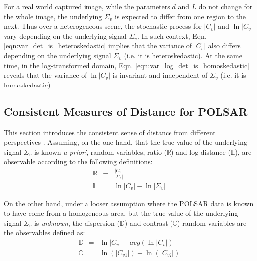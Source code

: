 \documentclass[journal]{IEEEtran}
\begin{document}
For a real world captured image, while the parameters $d$ and $L$ do not change for the whole image,
  the underlying $\Sigma_v$ is expected to differ from one region to the next.
Thus over a heterogeneous scene, the stochastic process for $|C_v|$ and $\ln |C_v|$ vary depending on the underlying signal $\Sigma_v$. 
In such context, Eqn. \ref{eqn:var_det_is_heteroskedastic} implies that the variance of $|C_v|$ also differs depending on the underlying signal $\Sigma_v$ (i.e. it is   heteroskedastic).
At the same time, in the log-transformed domain, Eqn. \ref{eqn:var_log_det_is_homoskedastic} reveals that
  the variance of $\ln |C_v|$ is invariant and independent of $\Sigma_v$ (i.e. it is homoskedastic).

\subsection{Consistent Measures of Distance for POLSAR}
\label{sec:distance_measure}

 This section introduces the consistent sense of distance from different perspectives \cite{Le_2010_ACRS}.
Assuming, on the one hand, that the true value of the underlying signal $\Sigma_v$ is known \textit{a priori},
random variables,
  ratio ($\mathbb{R}$) and log-distance ($\mathbb{L}$),
  are observable according to the following definitions:
\begin{eqnarray}
  \mathbb{R} &=& \frac{|C_v|}{|\Sigma_v|} \label{eqn:determinant_ratio_observables}\\
  \mathbb{L} &=& \ln|C_v| - \ln|\Sigma_v| \label{eqn:log_distance_observables} 
\end{eqnarray}

On the other hand, under a looser assumption %
  where the POLSAR data is known to have come from a homogeneous area, but the true value of the underlying signal $\Sigma_v$ is \textit{unknown},
  the dispersion ($\mathbb{D}$) and contrast ($\mathbb{C}$) random variables are the observables defined as:
\begin{eqnarray}
  \mathbb{D} &=& \ln{|C_v|} - avg(\ln{|C_v|}) \label{eqn:dispersion_observable}\\
  \mathbb{C} &=& \ln(|C_{v1}|) - \ln(|C_{v2}|) \label{eqn:contrast_observable}
\end{eqnarray}
\end{document}
